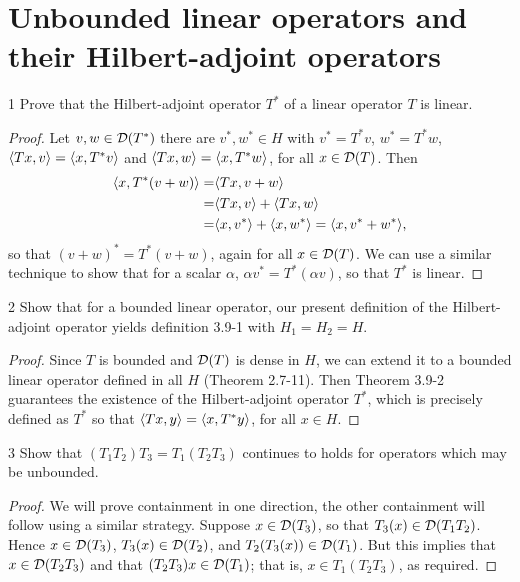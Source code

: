\section{Unbounded linear operators and their Hilbert-adjoint operators}


\begin{exercise}{1}
Prove that the Hilbert-adjoint operator $T^\ast$ of a linear operator $T$ is linear.
\end{exercise}
\begin{proof}
Let $v, w \in \mathcal{D}(T^\ast)$ there are $v^\ast, w^\ast \in H$ with $v^\ast = T^\ast v$, $w^\ast = T^\ast w$, $\langle Tx, v\rangle = \langle x, T^\ast v\rangle$ and $\langle Tx, w\rangle = \langle x, T^\ast w\rangle$, for all $x \in \mathcal{D}(T)$.
Then 
\begin{align*}
    \langle x, T^\ast (v + w)\rangle 
    =& \langle Tx, v + w\rangle\\
    =& \langle Tx, v\rangle + \langle Tx, w\rangle\\
    =& \langle x, v^\ast\rangle + \langle x, w^\ast\rangle
    = \langle x, v^\ast + w^\ast\rangle,
\end{align*}
so that $(v + w)^\ast = T^\ast (v + w)$, again for all $x \in \mathcal{D}(T)$.
We can use a similar technique to show that for a scalar $\alpha$, $\alpha v^\ast = T^\ast (\alpha v)$, so that $T^\ast$ is linear.
\end{proof} 

\begin{exercise}{2}
Show that for a bounded linear operator, our present definition of the Hilbert-adjoint operator yields definition 3.9-1 with $H_1 = H_2 = H$.
\end{exercise}
\begin{proof}
Since $T$ is bounded and $\mathcal{D}(T)$ is dense in $H$, we can extend it to a bounded linear operator defined in all $H$ (Theorem 2.7-11).
Then Theorem 3.9-2 guarantees the existence of the Hilbert-adjoint operator $T^\ast$, which is precisely defined as $T^\ast$ so that $\langle Tx, y\rangle = \langle x, T^\ast y\rangle$, for all $x \in H$.
\end{proof} 

\begin{exercise}{3}
Show that $(T_1 T_2) T_3 = T_1 (T_2 T_3)$ continues to holds for operators which may be unbounded.
\end{exercise}
\begin{proof}
We will prove containment in one direction, the other containment will follow using a similar strategy.
Suppose $x \in \mathcal{D}(T_3)$, so that $T_3(x) \in \mathcal{D}(T_1 T_2)$.
Hence $x \in \mathcal{D}(T_3)$, $T_3(x) \in \mathcal{D}(T_2)$, and $T_2 (T_3 (x)) \in \mathcal{D}(T_1)$.
But this implies that $x \in \mathcal{D}(T_2 T_3)$ and that $(T_2 T_3)x \in \mathcal{D}(T_1)$;
that is, $x \in T_1(T_2 T_3)$, as required.
\end{proof} 

